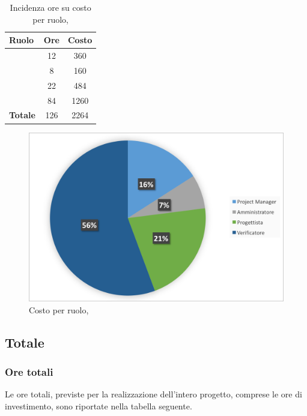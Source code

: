 \begin{table}[h]
	\begin{center}
		\begin{tabular}{|l|c|c|}
			\hline
			\textbf{Ruolo}	& \textbf{Ore} &	\textbf{Costo}	 \\
			\hline
			\textit{\Pm}	&	12	&	360		\\
			\hline
			\textit{\Am}	&	8	&	160		\\
			\hline
			\textit{\Prog}	&	22	&	484	\\
			\hline
			\textit{\Ver}	&	84	&	1260	\\
			\hline
			\textbf{Totale}	&	126	&	2264	\\
			\hline
		\end{tabular}
	\end{center}
	\caption{Incidenza ore su costo per ruolo, \VV}
\end{table}

\begin{figure}[H]
	\centering 
	\includegraphics[scale=0.7]{Immagini/GraficiTorteSezione6/VV.png}
	\caption{Costo per ruolo, \VV}
\end{figure}

\newpage
\subsection{Totale}
\subsubsection{Ore totali}
Le ore totali, previste per la realizzazione dell'intero progetto, comprese le ore di investimento, sono riportate nella tabella seguente.

